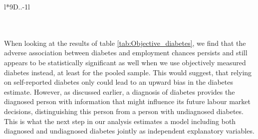 \begin{table}[h!]
\begin{center}
{{\begin{tabular}{l*{9}{D{.}{.}{-1}l}}
\\
\\
\\
\end{tabular}%
}
}
\end{center}
\caption{\label{tab:Self-reported_diabetes_biomarkersample}\textbf{Self-reported diabetes and labour market outcomes in biomarker subsample}}
\end{table}  


When looking at the results of table \ref{tab:Objective_diabetes},
we find that the adverse association between diabetes and employment
chances persists and still appears to be statistically significant
as well when we use objectively measured diabetes instead, at least
for the pooled sample. This would suggest, that relying on self-reported
diabetes only could lead to an upward bias in the diabetes estimate.
However, as discussed earlier, a diagnosis of diabetes provides the
diagnosed person with information that might influence its future
labour market decisions, distinguishing this person from
a person with undiagnosed diabetes. This is what the next step in
our analysis estimates a model including both diagnosed and undiagnosed
diabetes jointly as independent explanatory variables.

